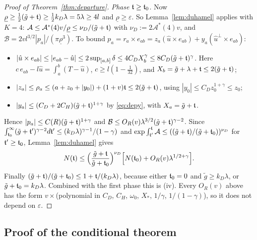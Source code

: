 \begin{proof}[Proof of Theorem~\ref{thm:departure}]
\emph{Phase $\mathfrak{t}\ge\mathfrak{t}_0$.} Now $\underline\rho\ge\frac12(\tilde g+\mathfrak{t})\ge\frac12k_D\lambda=5\lambda\ge4l$ and
$\underline\rho\ge\varepsilon$. So Lemma~\ref{lem:duhamel} applies with $K=4$:
$\mathcal A\le\mathcal A^*(4)v/\underline\rho\le\nu_D/(\tilde g+\mathfrak{t})$ with $\nu_D:=2\mathcal A^*(4)v$, and
$\mathcal B=2vl^{3/2}|p_a|/(\pi\underline\rho^3)$. To bound $p_a=r_a\times e_{ab}=z_a(\hat u\times e_{ab})+y_a(\hat u^\perp\times e_{ab})$:
\begin{itemize}\setlength{\itemsep}{1pt}
\item $|\hat u\times e_{ab}|\le|e_{ab}-\hat u|\le2\sup_{[a,b]}\delta\le4C_DX_b^\gamma\le8C_D(\tilde g+\mathfrak{t})^\gamma$. Here
$c\,e_{ab}-l\hat u=\int_a^b(T-\hat u)$, $c\ge l(1-\frac1{32})$, and $X_b=\tilde g+\lambda+\mathfrak{t}\le2(\tilde g+\mathfrak{t})$;
\item $|z_a|\le\rho_a\le(a+z_0+|y_0|)+(1+v)\mathfrak{t}\le2(\tilde g+\mathfrak{t})$, using $|y_0|\le C_Dz_0^{1+\gamma}\le z_0$;
\item $|y_a|\le(C_D+2C_H)(\tilde g+\mathfrak{t})^{1+\gamma}$ by \eqref{eq:depy}, with $X_a=\tilde g+\mathfrak{t}$.
\end{itemize}
Hence $|p_a|\le C(R)(\tilde g+\mathfrak{t})^{1+\gamma}$ and $\mathcal B\le O_R(v)\lambda^{3/2}(\tilde g+\mathfrak{t})^{\gamma-2}$. Since
$\int_{\mathfrak{t}_0}^\infty(\tilde g+\mathfrak{t}')^{\gamma-2}d\mathfrak{t}'\le(k_D\lambda)^{\gamma-1}/(1-\gamma)$ and
$\exp\int_{\mathfrak{t}'}^{\mathfrak{t}}\mathcal A\le((\tilde g+\mathfrak{t})/(\tilde g+\mathfrak{t}_0))^{\nu_D}$ for $\mathfrak{t}'\ge\mathfrak{t}_0$, Lemma~\ref{lem:duhamel} gives
\[
N(\mathfrak{t})\le\Bigl(\frac{\tilde g+\mathfrak{t}}{\tilde g+\mathfrak{t}_0}\Bigr)^{\nu_D}\Bigl[N(\mathfrak{t}_0)+O_R(v)\lambda^{1/2+\gamma}\Bigr].
\]
Finally $(\tilde g+\mathfrak{t})/(\tilde g+\mathfrak{t}_0)\le1+\mathfrak{t}/(k_D\lambda)$, because either $\mathfrak{t}_0=0$ and $\tilde g\ge k_D\lambda$, or
$\tilde g+\mathfrak{t}_0=k_D\lambda$. Combined with the first phase this is (iv). Every $O_R(v)$ above has the form
$v\times$(polynomial in $C_D$, $C_H$, $\omega_0$, $X_*$, $1/\gamma$, $1/(1-\gamma)$), so it does not depend on
$\varepsilon$.
\end{proof}

\subsection{Proof of the conditional theorem}\label{appC:assembly}

